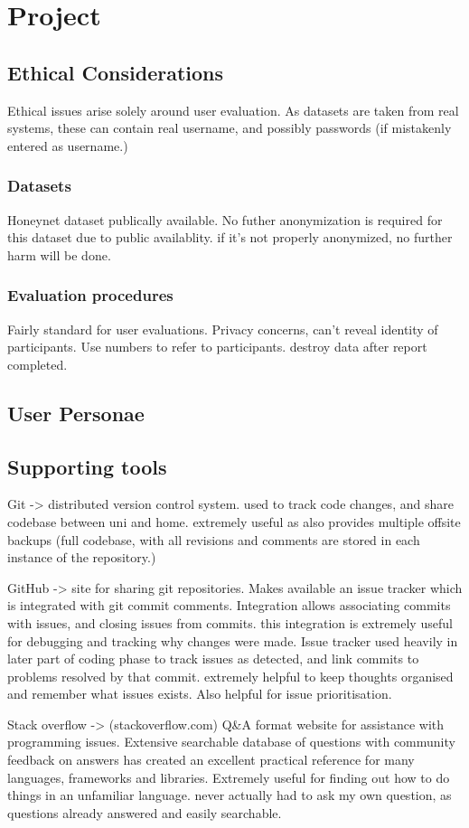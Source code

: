 \chapter{Project}\label{proj}

\section{Ethical Considerations}
Ethical issues arise solely around user evaluation.
As datasets are taken from real systems, these can contain real username, and possibly passwords (if mistakenly entered as username.)
\subsection{Datasets}
Honeynet dataset publically available. No futher anonymization is required for this dataset due to public availablity. if it's not properly anonymized, no further harm will be done. 

\subsection{Evaluation procedures}
Fairly standard for user evaluations. Privacy concerns, can't reveal identity of participants. 
Use numbers to refer to participants. destroy data after report completed. 

\section{User Personae}

\section{Supporting tools}
Git -> distributed version control system. used to track code changes, and share codebase between uni and home. extremely useful as also provides multiple offsite backups (full codebase, with all revisions and comments are stored in each instance of the repository.)

GitHub -> site for sharing git repositories. Makes available an issue tracker which is integrated with git commit comments. Integration allows associating commits with issues, and closing issues from commits. this integration is extremely useful for debugging and tracking why changes were made. Issue tracker used heavily in later part of coding phase to track issues as detected, and link commits to problems resolved by that commit.
extremely helpful to keep thoughts organised and remember what issues exists. Also helpful for issue prioritisation.

Stack overflow -> (stackoverflow.com) Q\&A format website for assistance with programming issues. Extensive searchable database of questions with community feedback on answers has created an excellent practical reference for many languages, frameworks and libraries.  Extremely useful for finding out how to do things in an unfamiliar language. never actually had to ask my own question, as questions already answered and easily searchable.